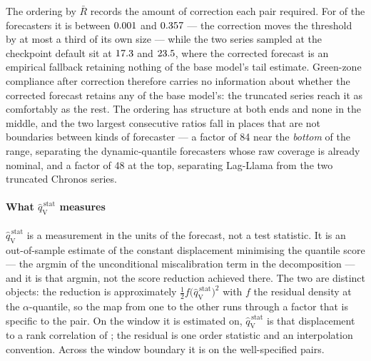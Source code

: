\documentclass[preprint,11pt,authoryear]{elsarticle}
\newcommand{\1}{\boldsymbol{1}}
\newcommand{\qVstat}{\hat{q}_{\scriptscriptstyle\mathrm{V}}^{\,\mathrm{stat}}}
\begin{document}
The ordering by $\bar R$ records the amount of correction each pair required.
For \nLitMainROkN{} of the \nMainForecasters{} forecasters it is between
$0.001$ and $0.357$ --- the correction moves the threshold
by at most a third of its own size --- while the two series sampled at the
checkpoint default sit at $17.3$ and $23.5$, where the
corrected forecast is an empirical fallback retaining nothing of the base
model's tail estimate. Green-zone compliance after correction therefore carries
no information about whether the corrected forecast retains any of the base
model's: the truncated series reach it as comfortably as the rest. The ordering
has structure at both ends and none in the middle, and the two largest
consecutive ratios fall in places that are not boundaries between kinds of
forecaster --- a factor of 84 near the \emph{bottom} of the range, separating the
dynamic-quantile forecasters whose raw coverage is already nominal, and a factor
of 48 at the top, separating Lag-Llama from the two truncated Chronos series.

\paragraph{What $\qVstat$ measures} $\qVstat$ is a measurement in the units of
the forecast, not a test statistic. It is an out-of-sample estimate of the
constant displacement minimising the quantile score --- the argmin of the
unconditional miscalibration term in the \citet{gneiting2023regression}
decomposition --- and it is that argmin, not the score reduction achieved there.
The two are distinct objects: the reduction is approximately
$\tfrac12 f \bigl(\qVstat\bigr)^2$ with $f$ the residual density at the $\alpha$-quantile,
so the map from one to the other runs through a factor that is specific to the
pair. On the window it is estimated on, $\qVstat$ is that displacement to a rank
correlation of \nMCBRhoCal{}; the residual is one order statistic and an
interpolation convention. Across the window boundary it is \nMCBRhoTest{} on the
\nMCBWellSpec{} well-specified pairs.
\end{document}
